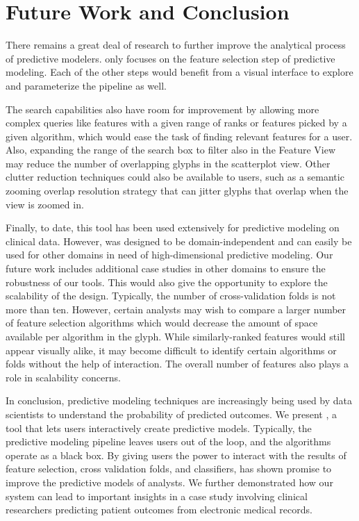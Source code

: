 
\section{Future Work and Conclusion}
There remains a great deal of research to further improve the analytical process of predictive modelers. \infuse only focuses on the feature selection step of predictive modeling. Each of the other steps would benefit from a visual interface to explore and parameterize the pipeline as well.

The search capabilities also have room for improvement by allowing more complex queries like features with a given range of ranks or features picked by a given algorithm, which would ease the task of finding relevant features for a user.
Also, expanding the range of the search box to filter also in the Feature View may reduce the number of overlapping glyphs in the scatterplot view.
Other clutter reduction techniques could also be available to users, such as a semantic zooming overlap resolution strategy that can jitter glyphs that overlap when the view is zoomed in.

Finally, to date, this tool has been used extensively for predictive modeling on clinical data.
However, \infuse was designed to be domain-independent and can easily be used for other domains in need of high-dimensional predictive modeling.  Our future work includes additional case studies in other domains to ensure the robustness of our tools.  This would also give the opportunity to explore the scalability of the design.  Typically, the number of cross-validation folds is not more than ten.  However, certain analysts may wish to compare a larger number of feature selection algorithms which would decrease the amount of space available per algorithm in the glyph.  While similarly-ranked features would still appear visually alike, it may become difficult to identify certain algorithms or folds without the help of interaction.  The overall number of features also plays a role in scalability concerns.

In conclusion, predictive modeling techniques are increasingly being used by data scientists to understand the probability of predicted outcomes.  We present \infuse, a tool that
lets users interactively create predictive models.  Typically, the predictive modeling pipeline leaves users out of the loop, and the algorithms operate as a black box.  By giving users the power to interact with the results of feature selection, cross validation folds, and classifiers, \infuse has shown promise to improve the predictive models of analysts.  We further demonstrated how our system can lead to important insights in a case study involving clinical researchers predicting patient outcomes from electronic medical records.
